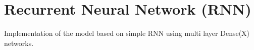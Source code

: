 \section{Recurrent Neural Network (RNN)}\label{sec:RNN}
Implementation of the model based on simple RNN using multi layer Dense(X) networks.~\cite{lees2010theoretical}